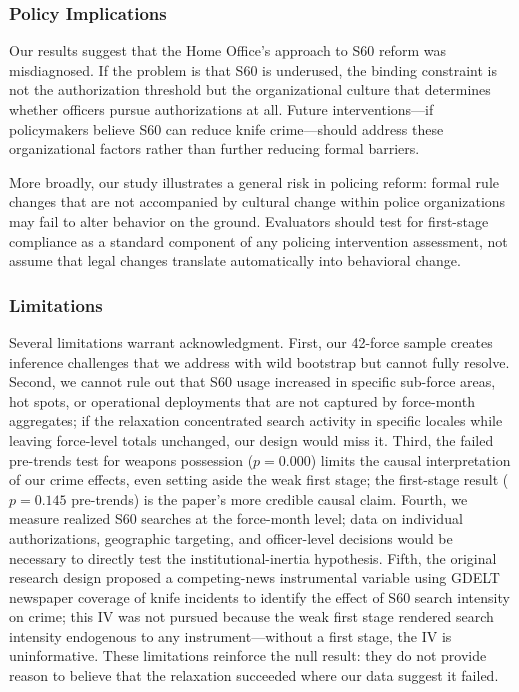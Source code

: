 \documentclass[12pt]{article}
\begin{document}
\subsubsection*{Policy Implications}

Our results suggest that the Home Office's approach to S60 reform was misdiagnosed. If the problem is that S60 is underused, the binding constraint is not the authorization threshold but the organizational culture that determines whether officers pursue authorizations at all. Future interventions---if policymakers believe S60 can reduce knife crime---should address these organizational factors rather than further reducing formal barriers.

More broadly, our study illustrates a general risk in policing reform: formal rule changes that are not accompanied by cultural change within police organizations may fail to alter behavior on the ground. Evaluators should test for first-stage compliance as a standard component of any policing intervention assessment, not assume that legal changes translate automatically into behavioral change.

\subsubsection*{Limitations}

Several limitations warrant acknowledgment. First, our 42-force sample creates inference challenges that we address with wild bootstrap but cannot fully resolve. Second, we cannot rule out that S60 usage increased in specific sub-force areas, hot spots, or operational deployments that are not captured by force-month aggregates; if the relaxation concentrated search activity in specific locales while leaving force-level totals unchanged, our design would miss it. Third, the failed pre-trends test for weapons possession ($p = 0.000$) limits the causal interpretation of our crime effects, even setting aside the weak first stage; the first-stage result ($p = 0.145$ pre-trends) is the paper's more credible causal claim. Fourth, we measure realized S60 searches at the force-month level; data on individual authorizations, geographic targeting, and officer-level decisions would be necessary to directly test the institutional-inertia hypothesis. Fifth, the original research design proposed a competing-news instrumental variable using GDELT newspaper coverage of knife incidents to identify the effect of S60 search intensity on crime; this IV was not pursued because the weak first stage rendered search intensity endogenous to any instrument---without a first stage, the IV is uninformative. These limitations reinforce the null result: they do not provide reason to believe that the relaxation succeeded where our data suggest it failed.
\end{document}
